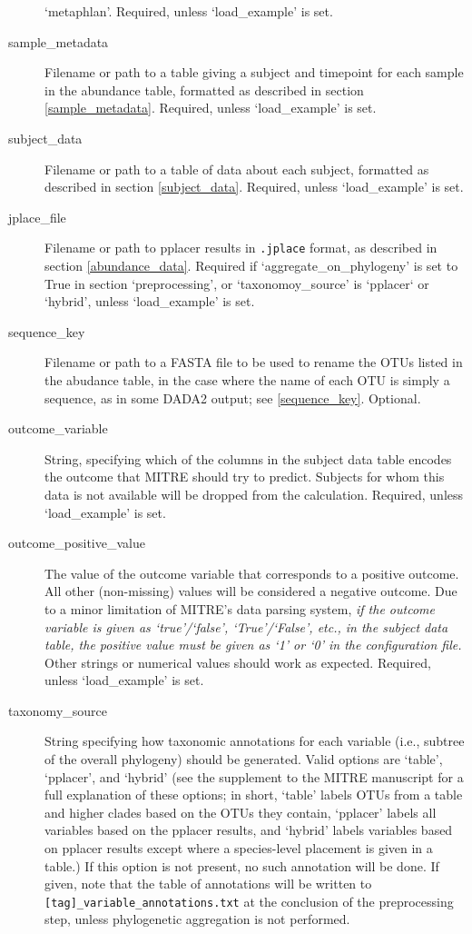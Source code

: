 \documentclass[12pt]{report}
\begin{document}
\begin{description}
  `metaphlan'. Required, unless `load\_example' is set.
\item[sample\_metadata]
  Filename or path to a table giving a subject and timepoint for each
  sample in the abundance table, formatted as described in section
  \ref{sample_metadata}. Required, unless `load\_example' is set.
\item[subject\_data]
  Filename or path to a table of data about each subject,
  formatted as described in section
  \ref{subject_data}. Required, unless `load\_example' is set.
\item[jplace\_file] Filename or path to pplacer results in
  \texttt{.jplace} format, as described in section
  \ref{abundance_data}. Required if `aggregate\_on\_phylogeny' is set
  to True in section `preprocessing', or `taxonomoy\_source' is
  `pplacer` or `hybrid', unless `load\_example' is set.
\item[sequence\_key]
  Filename or path to a FASTA file to be used to rename
  the OTUs listed in the abudance table, in the case where
  the name of each OTU is simply a sequence, as in some DADA2 output;
  see \ref{sequence_key}. Optional.
\item[outcome\_variable] String, specifying which of the columns in
  the subject data table encodes the outcome that MITRE should try to
  predict. Subjects for whom this data is not available will be
  dropped from the calculation.  Required, unless `load\_example' is
  set.
\item[outcome\_positive\_value] The value of the outcome variable that
  corresponds to a positive outcome. All other (non-missing) values
  will be considered a negative outcome. Due to a minor limitation of
  MITRE's data parsing system, \textit{if the outcome variable is
    given as `true'/`false', `True'/`False', etc., in the subject data
    table, the positive value must be given as `1' or `0' in the
    configuration file.}  Other strings or numerical values should
  work as expected. Required, unless `load\_example' is set.

\item[taxonomy\_source] String specifying how taxonomic annotations
  for each variable (i.e., subtree of the overall phylogeny) should be
  generated. Valid options are `table', `pplacer', and `hybrid' (see
  the supplement to the MITRE manuscript for a full explanation of
  these options; in short, `table' labels OTUs from a table and higher
  clades based on the OTUs they contain, `pplacer' labels all
  variables based on the pplacer results, and `hybrid' labels
  variables based on pplacer results except where a species-level
  placement is given in a table.) If this option is not present, no
  such annotation will be done. If given, note that the table of
  annotations will be written to
  \texttt{[tag]\_variable\_annotations.txt} at the conclusion of the
  preprocessing step, unless phylogenetic aggregation is not
  performed.


\end{description}
\end{document}
